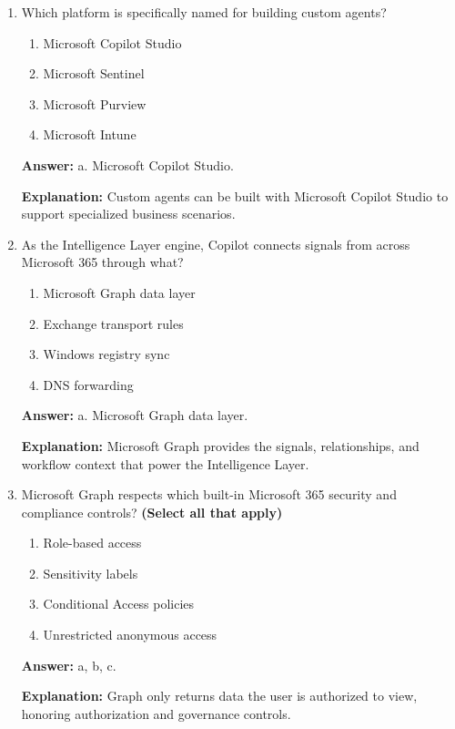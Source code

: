 \documentclass[10pt]{article}
\begin{document}
\begin{enumerate}[leftmargin=*]
\textbf{Explanation:} The example shows an agent automating a workflow trigger and response across services.

\item Which platform is specifically named for building custom agents?
\begin{enumerate}[label=\alph*., leftmargin=1.5em]
\item Microsoft Copilot Studio
\item Microsoft Sentinel
\item Microsoft Purview
\item Microsoft Intune
\end{enumerate}
\textbf{Answer:} a. Microsoft Copilot Studio.

\textbf{Explanation:} Custom agents can be built with Microsoft Copilot Studio to support specialized business scenarios.

\item As the Intelligence Layer engine, Copilot connects signals from across Microsoft 365 through what?
\begin{enumerate}[label=\alph*., leftmargin=1.5em]
\item Microsoft Graph data layer
\item Exchange transport rules
\item Windows registry sync
\item DNS forwarding
\end{enumerate}
\textbf{Answer:} a. Microsoft Graph data layer.

\textbf{Explanation:} Microsoft Graph provides the signals, relationships, and workflow context that power the Intelligence Layer.

\item Microsoft Graph respects which built-in Microsoft 365 security and compliance controls? \textbf{(Select all that apply)}
\begin{enumerate}[label=\alph*., leftmargin=1.5em]
\item Role-based access
\item Sensitivity labels
\item Conditional Access policies
\item Unrestricted anonymous access
\end{enumerate}
\textbf{Answer:} a, b, c.

\textbf{Explanation:} Graph only returns data the user is authorized to view, honoring authorization and governance controls.


\end{enumerate}
\end{document}
